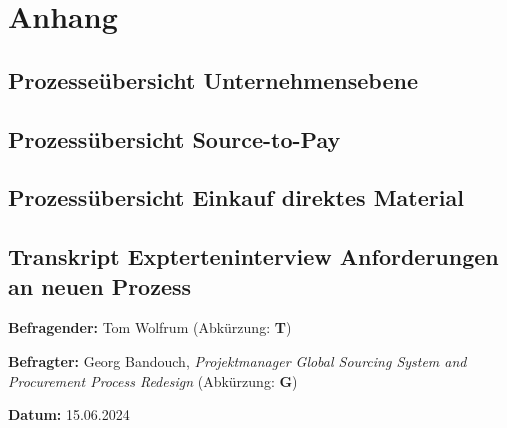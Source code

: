 \chapter{Anhang}

\section{Prozesseübersicht Unternehmensebene} \label{sec:AnhangA1}

\begin{figure}
    
\end{figure}
\clearpage

\section{Prozessübersicht Source-to-Pay} \label{sec:AnhangA2}

\begin{figure}
    
\end{figure}
\clearpage

\section{Prozessübersicht Einkauf direktes Material} \label{sec:AnhangA3}

\begin{figure}
    
\end{figure}
\clearpage

\section{Transkript Expterteninterview Anforderungen an neuen Prozess}

\textbf{Befragender:} Tom Wolfrum (Abkürzung: \textbf{T})

\textbf{Befragter:} Georg Bandouch, \textit{Projektmanager Global Sourcing System and Procurement Process Redesign} (Abkürzung: \textbf{G})

\textbf{Datum:} 15.06.2024

